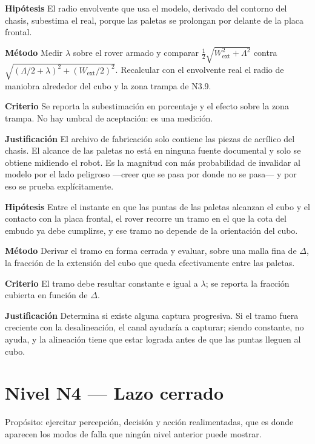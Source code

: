\documentclass[11pt,a4paper]{article}
\newenvironment{prueba}[2]{%
  \par\medskip\noindent
  \begin{tcolorbox}[enhanced,breakable,colback=white,colframe=black!45,
    boxrule=0.5pt,arc=1pt,left=6pt,right=6pt,top=4pt,bottom=4pt,
    title={\bfseries #1\quad\normalfont #2},
    colbacktitle=black!8,coltitle=black,fonttitle=\bfseries\small]
  \small
}{\end{tcolorbox}\par\medskip}
\newcommand{\campo}[1]{\par\smallskip\noindent\textbf{#1}\quad\ignorespaces}
\begin{document}
\begin{prueba}{N3.12}{Radio envolvente con las paletas incluidas}
\campo{Hipótesis} El radio envolvente que usa el modelo, derivado del contorno del chasis,
subestima el real, porque las paletas se prolongan por delante de la placa frontal.
\campo{Método} Medir $\lambda$ sobre el rover armado y comparar
$\tfrac12\sqrt{W_{\mathrm{ext}}^2+\Lambda^2}$ contra
$\sqrt{(\Lambda/2+\lambda)^2 + (W_{\mathrm{ext}}/2)^2}$. Recalcular con el envolvente real
el radio de maniobra alrededor del cubo y la zona trampa de N3.9.
\campo{Criterio} Se reporta la subestimación en porcentaje y el efecto sobre la zona
trampa. No hay umbral de aceptación: es una medición.
\campo{Justificación} El archivo de fabricación solo contiene las piezas de acrílico del
chasis. El alcance de las paletas no está en ninguna fuente documental y solo se obtiene
midiendo el robot. Es la magnitud con más probabilidad de invalidar al modelo por el lado
peligroso ---creer que se pasa por donde no se pasa--- y por eso se prueba explícitamente.
\end{prueba}

\begin{prueba}{N3.11}{Corredor de entrada: el tramo en que el cubo ya está contenido}
\campo{Hipótesis} Entre el instante en que las puntas de las paletas alcanzan el cubo y el
contacto con la placa frontal, el rover recorre un tramo en el que la cota del embudo ya
debe cumplirse, y ese tramo no depende de la orientación del cubo.
\campo{Método} Derivar el tramo en forma cerrada y evaluar, sobre una malla fina de
$\Delta$, la fracción de la extensión del cubo que queda efectivamente entre las paletas.
\campo{Criterio} El tramo debe resultar constante e igual a $\lambda$; se reporta la
fracción cubierta en función de $\Delta$.
\campo{Justificación} Determina si existe alguna captura progresiva. Si el tramo fuera
creciente con la desalineación, el canal ayudaría a capturar; siendo constante, no ayuda,
y la alineación tiene que estar lograda antes de que las puntas lleguen al cubo.
\end{prueba}

\section{Nivel N4 --- Lazo cerrado}

Propósito: ejercitar percepción, decisión y acción realimentadas, que es donde
aparecen los modos de falla que ningún nivel anterior puede mostrar.
\end{document}
